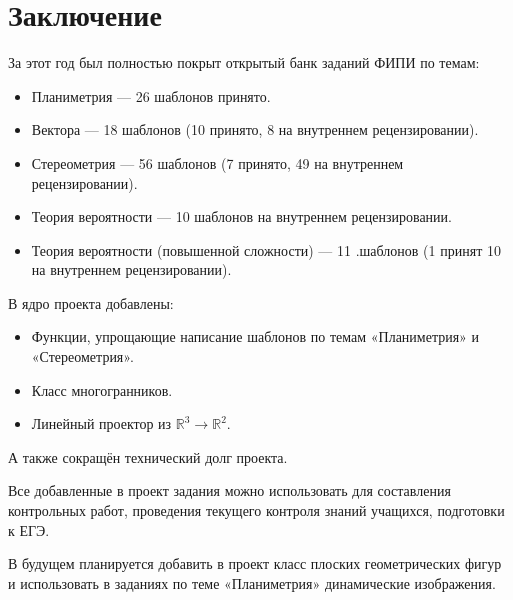 \section*{Заключение}
За этот год был полностью покрыт открытый банк заданий ФИПИ по темам:
		      \begin{itemize}
			      \item Планиметрия — 26 шаблонов принято.
			      \item Вектора — 18 шаблонов (10 принято, 8 на внутреннем рецензировании).
			      \item Стереометрия — 56 шаблонов (7 принято, 49 на внутреннем рецензировании).
			      \item Теория вероятности — 10 шаблонов на внутреннем рецензировании.
			      \item Теория вероятности (повышенной сложности) — 11 .шаблонов (1 принят 10 на внутреннем рецензировании).
		      \end{itemize}

В ядро проекта добавлены: 
\begin{itemize}
    \item Функции, упрощающие написание шаблонов по темам «Планиметрия» и  «Стереометрия».
    \item Класс многогранников.
    \item Линейный проектор из $\mathbb{R}^3 \to \mathbb{R}^2$.
\end{itemize}

А также сокращён технический долг проекта.

Все добавленные в проект задания можно использовать для составления контрольных работ, проведения текущего контроля знаний учащихся, подготовки к ЕГЭ.~\cite{chas-ege}

В будущем планируется добавить в проект класс плоских геометрических фигур и использовать в заданиях по теме «Планиметрия» динамические изображения.


